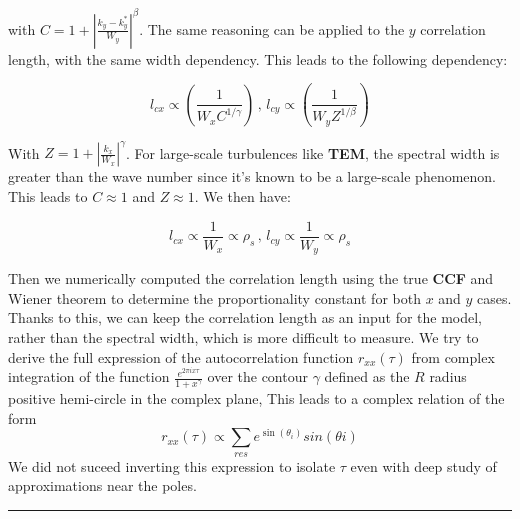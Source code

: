\documentclass[11pt,openany]{report}
\begin{document}
\begin{multicols}{2}
    with $ C = 1 + \left| \frac{k_y - k_y^*}{W_y} \right|^\beta $. The same reasoning can be applied to the \( y \) correlation length, with the same width dependency. This leads to the following dependency:

    $$
        l_{cx} \propto \left(\frac{1}{W_x C^{1/ \gamma}}\right) \, ,\, l_{cy} \propto \left(\frac{1}{W_y Z^{1/ \beta}}\right)
    $$

    With $ Z = 1 + \left| \frac{k_x}{W_x} \right|^\gamma $. For large-scale turbulences like \textbf{TEM}, the spectral width is greater than the wave number since it's known to be a large-scale phenomenon. This leads to $ C \approx 1 $ and $ Z \approx 1 $. We then have:

    $$
        l_{cx} \propto \frac{1}{W_x}  \propto \rho_s \, ,\, l_{cy} \propto \frac{1}{W_y} \propto \rho_s
    $$

    Then we numerically computed the correlation length using the true \textbf{CCF} and Wiener theorem to determine the proportionality constant for both $ x $ and $ y $ cases. Thanks to this, we can keep the correlation length as an input for the model, rather than the spectral width, which is more difficult to measure. We try to derive the full expression of the autocorrelation function $r_{xx}(\tau)$ from complex integration of the function $\frac{e^{2\pi ix \tau}}{1 + x^\gamma}$ over the contour $\gamma$ defined as the $R$ radius positive hemi-circle in the complex plane, This leads to a complex relation of the form $$r_{x x}(\tau) \propto \sum_{res} e^{\sin(\theta_i)}sin(\theta i) $$ We did not suceed inverting this expression to isolate $\tau$ even with deep study of approximations near the poles.
\end{multicols}
\noindent
\rule{\linewidth}{0.4pt}
\end{document}
